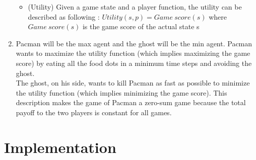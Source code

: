 \documentclass{article}
\begin{document}
\begin{enumerate}[label=\alph*.,leftmargin=*]
\begin{itemize}
			\item (Utility) Given a game state and a player function, the utility can be described as following : $Utility(s, p) = Game \ score(s)$ where $Game \ score(s)$ is the game score of the actual state s
    	\end{itemize}
    	
    \item Pacman will be the max agent and the ghost will be the min agent. Pacman wants to maximize the utility function (which implies maximizing the game score) by eating all the food dots in a minimum time steps and avoiding the ghost.\\
          The ghost, on his side, wants to kill Pacman as fast as possible to minimize the utility function (which implies minimizing the game score). This description makes the game of Pacman a zero-sum game because the total payoff to the two players is constant for all games.
\end{enumerate}

\section{Implementation}
\end{document}
